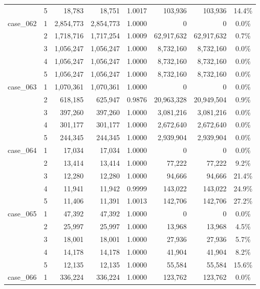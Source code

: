 \begin{footnotesize}
\begin{longtable}{l c rr c rr c}
 & 5 & 18{,}783 & 18{,}751 & 1.0017 & 103{,}936 & 103{,}936 & 14.4\% \\
\addlinespace[2pt]
case\_062 & 1 & 2{,}854{,}773 & 2{,}854{,}773 & 1.0000 & 0 & 0 & 0.0\% \\
 & 2 & 1{,}718{,}716 & 1{,}717{,}254 & 1.0009 & 62{,}917{,}632 & 62{,}917{,}632 & 0.7\% \\
 & 3 & 1{,}056{,}247 & 1{,}056{,}247 & 1.0000 & 8{,}732{,}160 & 8{,}732{,}160 & 0.0\% \\
 & 4 & 1{,}056{,}247 & 1{,}056{,}247 & 1.0000 & 8{,}732{,}160 & 8{,}732{,}160 & 0.0\% \\
 & 5 & 1{,}056{,}247 & 1{,}056{,}247 & 1.0000 & 8{,}732{,}160 & 8{,}732{,}160 & 0.0\% \\
\addlinespace[2pt]
case\_063 & 1 & 1{,}070{,}361 & 1{,}070{,}361 & 1.0000 & 0 & 0 & 0.0\% \\
 & 2 & 618{,}185 & 625{,}947 & 0.9876 & 20{,}963{,}328 & 20{,}949{,}504 & 0.9\% \\
 & 3 & 397{,}260 & 397{,}260 & 1.0000 & 3{,}081{,}216 & 3{,}081{,}216 & 0.0\% \\
 & 4 & 301{,}177 & 301{,}177 & 1.0000 & 2{,}672{,}640 & 2{,}672{,}640 & 0.0\% \\
 & 5 & 244{,}345 & 244{,}345 & 1.0000 & 2{,}939{,}904 & 2{,}939{,}904 & 0.0\% \\
\addlinespace[2pt]
case\_064 & 1 & 17{,}034 & 17{,}034 & 1.0000 & 0 & 0 & 0.0\% \\
 & 2 & 13{,}414 & 13{,}414 & 1.0000 & 77{,}222 & 77{,}222 & 9.2\% \\
 & 3 & 12{,}280 & 12{,}280 & 1.0000 & 94{,}666 & 94{,}666 & 21.4\% \\
 & 4 & 11{,}941 & 11{,}942 & 0.9999 & 143{,}022 & 143{,}022 & 24.9\% \\
 & 5 & 11{,}406 & 11{,}391 & 1.0013 & 142{,}706 & 142{,}706 & 27.2\% \\
\addlinespace[2pt]
case\_065 & 1 & 47{,}392 & 47{,}392 & 1.0000 & 0 & 0 & 0.0\% \\
 & 2 & 25{,}997 & 25{,}997 & 1.0000 & 13{,}968 & 13{,}968 & 4.5\% \\
 & 3 & 18{,}001 & 18{,}001 & 1.0000 & 27{,}936 & 27{,}936 & 5.7\% \\
 & 4 & 14{,}178 & 14{,}178 & 1.0000 & 41{,}904 & 41{,}904 & 8.2\% \\
 & 5 & 12{,}135 & 12{,}135 & 1.0000 & 55{,}584 & 55{,}584 & 15.6\% \\
\addlinespace[2pt]
case\_066 & 1 & 336{,}224 & 336{,}224 & 1.0000 & 123{,}762 & 123{,}762 & 0.0\% \\

\end{longtable}
\end{footnotesize}
